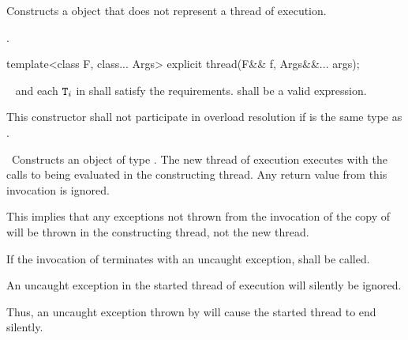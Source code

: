\begin{itemdescr}
\pnum\effects Constructs a  object that does not represent a thread of execution.

\pnum\postconditions {}.
\end{itemdescr}

%
\begin{itemdecl}
template<class F, class... Args> explicit thread(F&& f, Args&&... args);
\end{itemdecl}

\begin{itemdescr}
\pnum
\requires\  and each $\texttt{T}_i$ in  shall satisfy the
 requirements.
 shall be
a va\-lid expression.

\pnum
\remarks
This constructor shall not participate in overload resolution if 
is the same type as .

\pnum
\effects\ Constructs an object of type . The new thread of execution executes
 with the calls to
 being evaluated in the constructing thread. Any return value from this invocation
is ignored. \begin{note} This implies that any exceptions not thrown from the invocation of the copy
of  will be thrown in the constructing thread, not the new thread. \end{note} If the
invocation of
termi\-nates with an uncaught exception,  shall be called.

{\color{insertcolor}
An uncaught  exception in the started thread of execution
will silently be ignored.
\begin{note} Thus, an uncaught exception thrown by 
             will cause the started thread to end silently.
             \end{note}
}%


\end{itemdescr}
